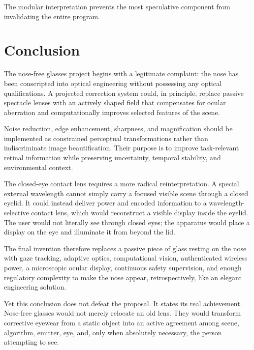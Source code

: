 \documentclass[11pt]{article}
\begin{document}
The modular interpretation prevents the most speculative component from invalidating the entire program.

\section{Conclusion}

The nose-free glasses project begins with a legitimate complaint: the nose has been conscripted into optical engineering without possessing any optical qualifications. A projected correction system could, in principle, replace passive spectacle lenses with an actively shaped field that compensates for ocular aberration and computationally improves selected features of the scene.

Noise reduction, edge enhancement, sharpness, and magnification should be implemented as constrained perceptual transformations rather than indiscriminate image beautification. Their purpose is to improve task-relevant retinal information while preserving uncertainty, temporal stability, and environmental context.

The closed-eye contact lens requires a more radical reinterpretation. A special external wavelength cannot simply carry a focused visible scene through a closed eyelid. It could instead deliver power and encoded information to a wavelength-selective contact lens, which would reconstruct a visible display inside the eyelid. The user would not literally see through closed eyes; the apparatus would place a display on the eye and illuminate it from beyond the lid.

The final invention therefore replaces a passive piece of glass resting on the nose with gaze tracking, adaptive optics, computational vision, authenticated wireless power, a microscopic ocular display, continuous safety supervision, and enough regulatory complexity to make the nose appear, retrospectively, like an elegant engineering solution.

Yet this conclusion does not defeat the proposal. It states its real achievement. Nose-free glasses would not merely relocate an old lens. They would transform corrective eyewear from a static object into an active agreement among scene, algorithm, emitter, eye, and, only when absolutely necessary, the person attempting to see.
\end{document}
